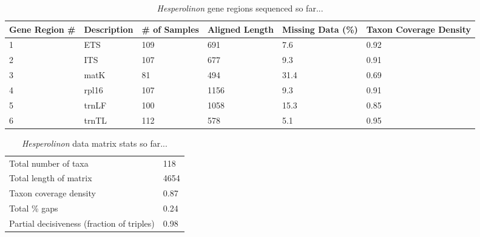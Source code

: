 \documentclass[12pt]{article}
\begin{document}
\begin{table}
    \center
    \begin{adjustbox}{max width=\textwidth}
        \begin{tabular}{llllll}
            \toprule
            Gene Region \#&Description&\# of Samples&Aligned Length&Missing Data (\%)&Taxon Coverage Density \\
            \midrule
            1&ETS&109&691&7.6&0.92 \\
            2&ITS&107&677&9.3&0.91 \\
            3&matK&81&494&31.4&0.69 \\
            4&rpl16&107&1156&9.3&0.91 \\
            5&trnLF&100&1058&15.3&0.85 \\
            6&trnTL&112&578&5.1&0.95 \\
            \bottomrule
        \end{tabular}
    \end{adjustbox}
    \caption{\textit{Hesperolinon} gene regions sequenced so far...}
\end{table}

\begin{table}
    \center
    \begin{adjustbox}{max width=\textwidth}
        \begin{tabular}{l|l}
            \toprule
            Total number of taxa & 118 \\
            Total length of matrix & 4654 \\
            Taxon coverage density & 0.87 \\
            Total \% gaps & 0.24 \\
            Partial decisiveness (fraction of triples) & 0.98 \\
            \bottomrule
        \end{tabular}
    \end{adjustbox}
    \caption{\textit{Hesperolinon} data matrix stats so far...}
\end{table}
\end{document}
